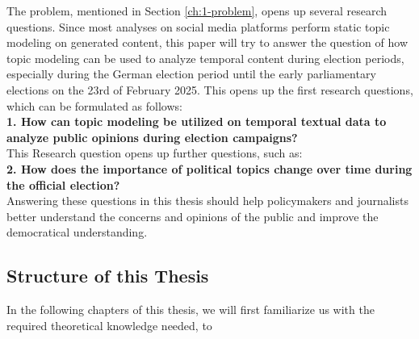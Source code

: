 The problem, mentioned in Section \ref{ch:1-problem}, opens up several research questions. Since most analyses on social media platforms perform static topic modeling on generated content, this paper will try to answer the question of how topic modeling can be used to analyze temporal content during election periods, especially during the German election period until the early parliamentary elections on the 23rd of February 2025. This opens up the first research questions, which can be formulated as follows: \\

\textbf{1. How can topic modeling be utilized on temporal textual data to analyze public opinions during election campaigns?}\\

This Research question opens up further questions, such as:\\

\textbf{2. How does the importance of political topics change over time during the official election?}\\


Answering these questions in this thesis should help policymakers and journalists better understand the concerns and opinions of the public and improve the democratical understanding.



\subsection{Structure of this Thesis}

In the following chapters of this thesis, we will first familiarize us with the required theoretical knowledge needed, to 


